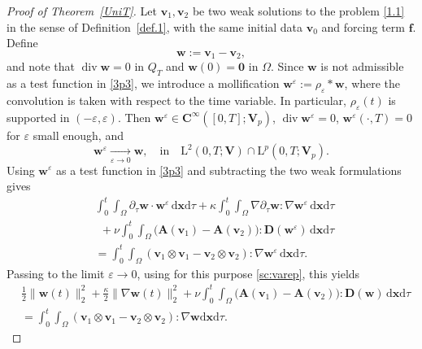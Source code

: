 \documentclass[12pt,reqno]{amsart}
\numberwithin{equation}{section}
\theoremstyle{definition}
\def\d{\mathrm{d}}
\def\div{\operatorname{div}}
\def\L{\mathrm{L}}
\def\vv{\boldsymbol{v}}
\def\w{\boldsymbol{w}}
\def\x{\boldsymbol{x}}
\def\bfC{\mathbf{C}}
\def\bfV{\mathbf{V}}
\def\bfD{\mathbf{D}}
\def\bfA{\mathbf{A}}
\def\bf0{\mathbf{0}}
\begin{document}
{{
\begin{proof}[Proof of Theorem~\ref{UniT}]
Let $\boldsymbol{v}_1, \boldsymbol{v}_2$ be two weak solutions  to the problem \eqref{1.1} in the sense of Definition~\ref{def.1}, with the same initial data $\boldsymbol{v}_0$ and forcing term $\boldsymbol{f}$.
Define
\begin{equation*}
\boldsymbol{w} := \boldsymbol{v}_1 - \boldsymbol{v}_2,
\end{equation*}
and note that $\div\w=0$ in $Q_T$ and $\w(0)=\bf0$ in $\Omega$.
Since $\w$ is not admissible as a test function in \eqref{3p3}, we introduce a mollification $\w^\varepsilon := \rho_\varepsilon * \w$, where the convolution is taken with respect to the time variable.
In particular, $\rho_\varepsilon(t)$ is supported in $(-\varepsilon,\varepsilon)$.
Then $\w^\varepsilon \in \bfC^\infty([0,T];\bfV_p)$, $\div\w^\varepsilon=0$, $\w^\varepsilon(\cdot,T)=0$ for $\varepsilon$ small enough, and
\begin{equation}
\label{sc:varep}
\w^\varepsilon \xrightarrow[\varepsilon\to0]{} \w,\quad \text{in}\quad \L^2(0,T;\bfV)\cap\L^p(0,T;\bfV_p).
\end{equation}
Using $\boldsymbol{w}^\varepsilon$ as a test function in \eqref{3p3} and subtracting the two weak formulations gives
\begin{align*}
& \int_0^t\!\!\int_\Omega \partial_\tau\boldsymbol{w} \cdot \boldsymbol{w}^\varepsilon \, \d \x\d\tau
+ \kappa \int_0^t\!\!\int_\Omega \nabla \partial_\tau\boldsymbol{w} : \nabla \boldsymbol{w}^\varepsilon \, \d \x\d\tau\ \\&\  \ +  \nu \int_0^t\!\!\int_\Omega \big(\bfA(\vv_1)-\bfA(\vv_2)\big):\mathbf{D}(\boldsymbol{w}^\varepsilon) \, \d \x\d\tau  \\
&= \int_0^t\!\!\int_\Omega (\boldsymbol{v}_1 \otimes \boldsymbol{v}_1 - \boldsymbol{v}_2 \otimes \boldsymbol{v}_2) : \nabla \boldsymbol{w}^\varepsilon \, \d \x\d\tau.
\end{align*}
Passing to the limit $\varepsilon \to 0$, using for this purpose \eqref{sc:varep}, this yields
\begin{equation*} %
\begin{split}
& \frac{1}{2}\|\w(t)\|_{2}^2 + \frac{\kappa}{2}\|\nabla \w(t)\|_{2}^2 + \nu \int_0^t\!\!\int_\Omega \big(\bfA(\vv_1)-\bfA(\vv_2)\big):\bfD(\w)\,\d\x\d\tau  \\
&=  \int_0^t\!\!\int_\Omega (\vv_1\otimes\vv_1-\vv_2\otimes\vv_2):\mathds{\nabla}\w\d\x\d\tau.
\end{split}
\end{equation*}

\end{proof}}}
\end{document}
